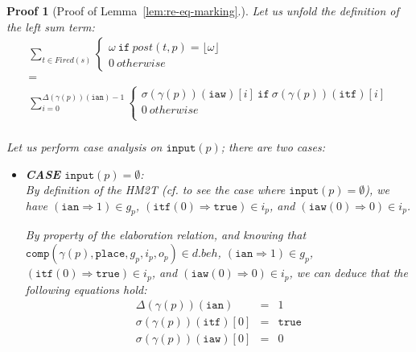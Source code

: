 \documentclass[pdflatex,sn-mathphys]{sn-jnl}%
\theoremstyle{thmstyleone}%
\theoremstyle{thmstyletwo}%
\newtheorem*{pf}{Proof}%
\theoremstyle{thmstylethree}%
\begin{document}
\begin{pf}[Proof of Lemma~\ref{lem:re-eq-marking}.]
  \bigskip
  
  \noindent{}Let us unfold the definition of the left sum term:\\
  \begin{equation*}
    \boxed{\begin{array}{c}
      \sum\limits_{t\in{}Fired(s)}
      \begin{cases}
        \omega~\mathtt{if}~post(t,p)=\lfloor\omega\rfloor \\
        0~otherwise
      \end{cases} \\
      = \\
      \sum\limits_{i=0}^{\Delta(\gamma(p))(\texttt{ian})-1}
      \begin{cases}
        \sigma(\gamma(p))(\texttt{iaw})[i]~\mathtt{if}~\sigma(\gamma(p))(\texttt{itf})[i]\\
        0~otherwise \\
      \end{cases} \\
    \end{array}}
  \end{equation*}

  \bigskip
  
  \noindent{}Let us perform case analysis on $\mathtt{input}(p)$;
  there are two cases:

  \begin{itemize}
  \item \textbf{CASE} $\mathtt{input}(p)=\emptyset$:\\
    
    By definition of the HM2T (cf. \cite{Iampietro2022hfspec} to see
    the case where $\mathtt{input}(p)=\emptyset$), we have
    $(\mathtt{ian}\Rightarrow{}1)\in{}g_p$,
    $(\mathtt{itf}(0)\Rightarrow{}\mathtt{true})\in{}i_p$, and
    $(\mathtt{iaw}(0)\Rightarrow{}0)\in{}i_p$.

    By property of the elaboration relation, and knowing that
    $\mathtt{comp}(\gamma(p),\mathtt{place},g_p,i_p,o_p)\in{}d.beh$,
    $(\mathtt{ian}\Rightarrow{}1)\in{}g_p$,
    $(\mathtt{itf}(0)\Rightarrow{}\mathtt{true})\in{}i_p$, and
    $(\mathtt{iaw}(0)\Rightarrow{}0)\in{}i_p$, we can deduce that the
    following equations hold:
    \begin{eqnarray}
      \label{eq:eq-ian-itfz-iawz-0}
      \Delta(\gamma(p))(\texttt{ian})&=&1 \\
      \label{eq:eq-ian-itfz-iawz-1}\sigma(\gamma(p))(\texttt{itf})[0]&=&\mathtt{true} \\
      \label{eq:eq-ian-itfz-iawz-2}\sigma(\gamma(p))(\texttt{iaw})[0]&=&0
    \end{eqnarray}


\end{itemize}
\end{pf}
\end{document}
